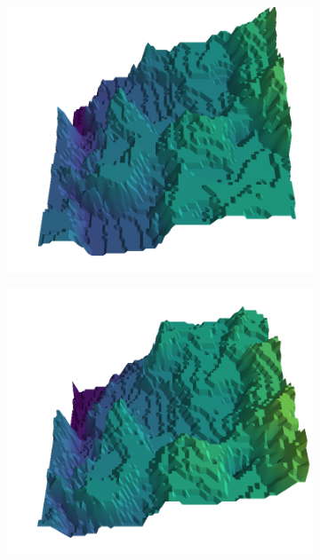 \documentclass[../document.tex]{subfiles}
\begin{document}
\begin{figure}[H]
    \begin{subfigure}[b]{0.19\textwidth}
        \includegraphics[width=\linewidth]{../img/5/quarry/worst//patch-3d-majavi-colormap-2.png}
    \end{subfigure}
    \begin{subfigure}[b]{0.19\textwidth}
        \includegraphics[width=\linewidth]{../img/5/quarry/worst//patch-3d-majavi-colormap-3.png}
    \end{subfigure}  

\end{figure}
\end{document}
